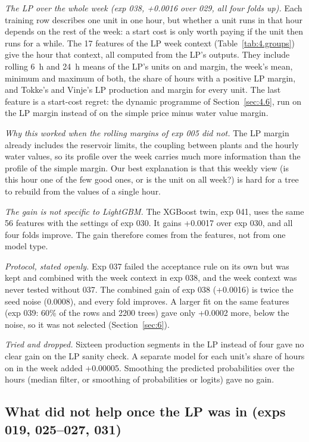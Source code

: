 \emph{The LP over the whole week (exp 038, +0.0016 over 029, all four folds up).} Each training row describes one unit in one hour, but whether a unit runs in that hour depends on the rest of the week: a start cost is only worth paying if the unit then runs for a while. The 17 features of the LP week context (Table~\ref{tab:4.groups}) give the hour that context, all computed from the LP's outputs. They include rolling 6~h and 24~h means of the LP's units on and margin, the week's mean, minimum and maximum of both, the share of hours with a positive LP margin, and Tokke's and Vinje's LP production and margin for every unit. The last feature is a start-cost regret: the dynamic programme of Section~\ref{sec:4.6}, run on the LP margin instead of on the simple price minus water value margin.

\emph{Why this worked when the rolling margins of exp 005 did not.} The LP margin already includes the reservoir limits, the coupling between plants and the hourly water values, so its profile over the week carries much more information than the profile of the simple margin. Our best explanation is that this weekly view (is this hour one of the few good ones, or is the unit on all week?) is hard for a tree to rebuild from the values of a single hour.

\emph{The gain is not specific to LightGBM.} The XGBoost twin, exp 041, uses the same 56 features with the settings of exp 030. It gains +0.0017 over exp 030, and all four folds improve. The gain therefore comes from the features, not from one model type.

\emph{Protocol, stated openly.} Exp 037 failed the acceptance rule on its own but was kept and combined with the week context in exp 038, and the week context was never tested without 037. The combined gain of exp 038 (+0.0016) is twice the seed noise (0.0008), and every fold improves. A larger fit on the same features (exp 039: 60\% of the rows and 2200 trees) gave only +0.0002 more, below the noise, so it was not selected (Section~\ref{sec:6}).

\emph{Tried and dropped.} Sixteen production segments in the LP instead of four gave no clear gain on the LP sanity check. A separate model for each unit's share of hours on in the week added +0.00005. Smoothing the predicted probabilities over the hours (median filter, or smoothing of probabilities or logits) gave no gain.

\subsection{What did not help once the LP was in (exps 019, 025–027, 031)}\label{sec:4.10}

